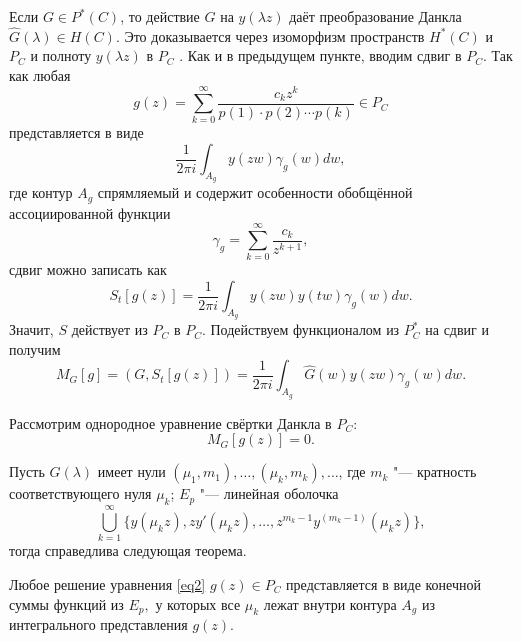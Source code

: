 Если $G\in P^*(C)$, то действие $G$ на $y(\lambda z)$ даёт преобразование Данкла $\hat G(\lambda)\in H(C)$. Это доказывается через изоморфизм пространств $H^*(C)$ и $P_C$ и полноту $y(\lambda z)$ в $P_C$ \cite{zabirova2}. 
Как и в предыдущем пункте, вводим сдвиг в $P_C$. 
Так как любая $$g(z)=\sum\limits^{\infty}_{k=0} \frac{c_k z^k}{p(1)\cdot p(2)\cdots p(k)}\in P_C$$ представляется в виде $$\frac 1{2\pi i}\int_{A_g} {y(zw)\gamma_g (w)dw},$$ 
где контур $A_g$ спрямляемый и содержит особенности обобщённой ассоциированной функции $$\gamma_g=\sum\limits^{\infty}_{k=0}\frac{c_k}{z^{k+1}},$$ 
сдвиг можно записать как $$S_t[g(z)]=\frac 1{2\pi i}\int_{A_g} {y(zw)y(tw)\gamma_g (w)dw}.$$ 
Значит, $S$ действует из $P_C$ в $P_C$. Подействуем функционалом из $P^*_C$ на сдвиг и получим 
\begin{equation} \label{eq2.1}
M_G[g]=(G,S_t[g(z)])=\frac1{2\pi i}\int_{A_g} {\hat G(w)y(zw)\gamma_g (w)dw}.
\end{equation}


Рассмотрим однородное уравнение свёртки Данкла в $P_C$:
\begin{equation} \label{eq2}
M_G[g(z)]=0.
\end{equation}

Пусть $\hat G(\lambda)$ имеет нули $(\mu_1,m_1), \dots, (\mu_k,m_k), \dots$, где $m_k$ "--- кратность соответствующего нуля $\mu_k$; $E_p$ "--- линейная оболочка  $$\bigcup\limits^{\infty}_{k=1} \{y(\mu_kz),zy'(\mu_kz),\dots,z^{m_k-1}y^{(m_k-1)}(\mu_kz)\},$$ тогда справедлива следующая теорема. 

\smallskip

\begin{theorem}[3]Любое решение уравнения \eqref{eq2} $g(z)\in P_C$ представляется в виде конечной суммы функций из $E_p,$ у которых все $\mu_k$ лежат внутри контура $A_g$ из интегрального представления $g(z).$
\end{theorem}

\smallskip


